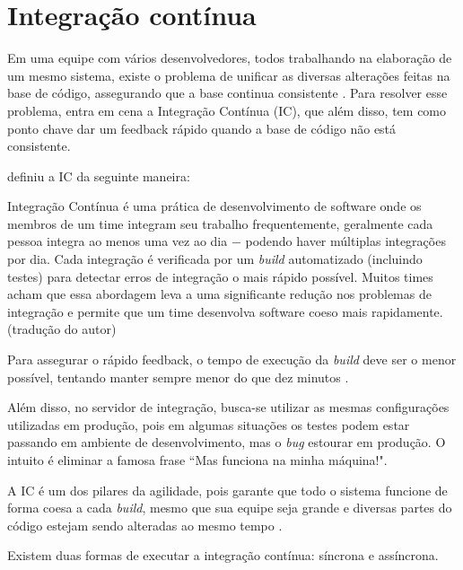 


\section{Integração contínua} %
\label{sec:integracao_continua}

Em uma equipe com vários desenvolvedores, todos trabalhando na elaboração de um mesmo sistema, existe o problema de unificar as diversas alterações feitas na base de código, assegurando que a base continua consistente \cite{ImproveitCI}. Para resolver esse problema, entra em cena a Integração Contínua (IC), que além disso, tem como ponto chave dar um feedback rápido quando a base de código não está consistente.

\cite{FowlerCI} definiu a IC da seguinte maneira:

\begin{citacao}
Integração Contínua é uma prática de desenvolvimento de software onde os membros de um time integram seu trabalho frequentemente, geralmente cada pessoa integra ao menos uma vez ao dia $-$ podendo haver múltiplas integrações por dia. Cada integração é verificada por um \textit{build} automatizado (incluindo testes) para detectar erros de integração o mais rápido possível. Muitos times acham que essa abordagem leva a uma significante redução nos problemas de integração e permite que um time desenvolva software coeso mais rapidamente. (tradução do autor)
\end{citacao}

Para assegurar o rápido feedback, o tempo de execução da \textit{build} deve ser o menor possível, tentando manter sempre menor do que dez minutos \cite{FowlerCI}.

Além disso, no servidor de integração, busca-se utilizar as mesmas configurações utilizadas em produção, pois em algumas situações os testes podem estar passando em ambiente de desenvolvimento, mas o \textit{bug} estourar em produção. O intuito é eliminar a famosa frase ``Mas funciona na minha máquina!".

A IC é um dos pilares da agilidade, pois garante que todo o sistema funcione de forma coesa a cada \textit{build}, mesmo que sua equipe seja grande e diversas partes do código estejam sendo alteradas ao mesmo tempo \cite{CaelumCI}.

Existem duas formas de executar a integração contínua: síncrona e assíncrona.

